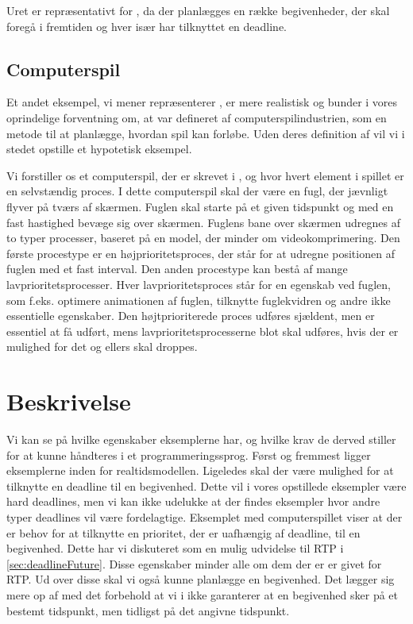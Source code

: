Uret er repræsentativt for \is, da der planlægges en række begivenheder, der skal foregå i fremtiden og hver især har tilknyttet en deadline.

\subsection{Computerspil}
Et andet eksempel, vi mener repræsenterer  \is, er mere realistisk og bunder i vores oprindelige forventning om, at \is  var defineret af computerspilindustrien, som en metode til at planlægge, hvordan spil kan forløbe. Uden deres definition af \is vil vi i stedet opstille et hypotetisk eksempel. 

Vi forstiller os et computerspil, der er skrevet i \pycsp, og hvor hvert element i spillet er en selvstændig proces. I dette computerspil skal der være en fugl, der jævnligt flyver på tværs af skærmen. Fuglen skal starte på et given tidspunkt og med en fast hastighed bevæge sig over skærmen. Fuglens bane over skærmen udregnes af to typer processer, baseret på en model, der minder om videokomprimering. Den første procestype er en højprioritetsproces, der står for at udregne positionen af fuglen med  et fast interval. Den anden procestype kan bestå af mange lavprioritetsprocesser. Hver lavprioritetsproces står for en egenskab ved fuglen, som  f.eks. optimere animationen af fuglen, tilknytte fuglekvidren og andre ikke essentielle egenskaber. Den højtprioriterede proces udføres sjældent, men er essentiel at få udført, mens lavprioritetsprocesserne blot skal udføres, hvis der er mulighed for det og ellers skal droppes.

\section{Beskrivelse}
Vi kan se på hvilke egenskaber eksemplerne har, og hvilke krav de derved stiller for at kunne håndteres i et programmeringssprog. Først og fremmest ligger eksemplerne  inden for realtidsmodellen. Ligeledes skal der være mulighed for at tilknytte en deadline til en begivenhed. Dette vil i vores opstillede eksempler være hard deadlines, men vi kan ikke udelukke at der findes eksempler hvor andre typer deadlines vil være fordelagtige. Eksemplet med computerspillet viser at der er behov for at tilknytte en prioritet, der er uafhængig af deadline, til en begivenhed. Dette har vi diskuteret som en mulig udvidelse til RTP i \cref{sec:deadlineFuture}. Disse egenskaber minder alle om dem der er er givet for RTP. Ud over disse skal vi også kunne planlægge en begivenhed. Det lægger sig mere op af \des med det forbehold at vi i \is ikke garanterer at en begivenhed sker på et bestemt tidspunkt, men tidligst på det angivne tidspunkt.  

